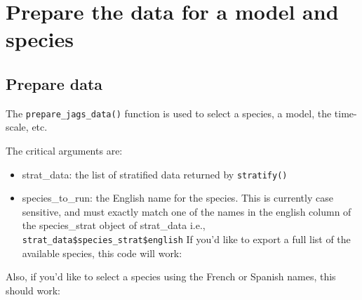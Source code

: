 \documentclass[
]{book}
\newenvironment{Shaded}{\begin{snugshade}}{\end{snugshade}}
\newcommand{\CommentTok}[1]{\textcolor[rgb]{0.56,0.35,0.01}{\textit{#1}}}
\newcommand{\FunctionTok}[1]{\textcolor[rgb]{0.00,0.00,0.00}{#1}}
\newcommand{\NormalTok}[1]{#1}
\newcommand{\OtherTok}[1]{\textcolor[rgb]{0.56,0.35,0.01}{#1}}
\newcommand{\SpecialCharTok}[1]{\textcolor[rgb]{0.00,0.00,0.00}{#1}}
\newcommand{\StringTok}[1]{\textcolor[rgb]{0.31,0.60,0.02}{#1}}
\providecommand{\tightlist}{%
  \setlength{\itemsep}{0pt}\setlength{\parskip}{0pt}}
\begin{document}
\hypertarget{DataPrep}{%
\chapter{Prepare the data for a model and species}\label{DataPrep}}

\hypertarget{prepare-data}{%
\section{Prepare data}\label{prepare-data}}

The \texttt{prepare\_jags\_data()} function is used to select a species, a model, the time-scale, etc.

The critical arguments are:

\begin{itemize}
\tightlist
\item
  strat\_data: the list of stratified data returned by \texttt{stratify()}
\item
  species\_to\_run: the English name for the species. This is currently case sensitive, and must exactly match one of the names in the english column of the species\_strat object of strat\_data i.e., \texttt{strat\_data\$species\_strat\$english}
  If you'd like to export a full list of the available species, this code will work:
\end{itemize}

\begin{Shaded}
\end{Shaded}

Also, if you'd like to select a species using the French or Spanish names, this should work:

\begin{Shaded}
\end{Shaded}
\end{document}
